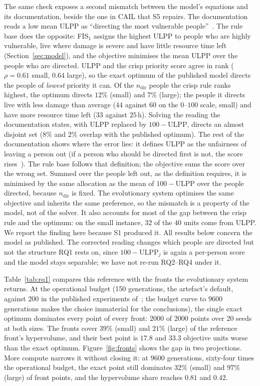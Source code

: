 \documentclass[systems,article,submit,moreauthors,pdftex]{Definitions/mdpi}
\begin{document}
The same check exposes a second mismatch between the model's equations and its
documentation, beside the one in CAIL that S5 repairs. The documentation reads a low mean ULPP
as ``directing the most vulnerable people''~\cite{rabiei2026resilient}. The rule base does the
opposite: FIS$_1$ assigns the highest ULPP to people who are highly vulnerable, live where
damage is severe and have little resource time left (Section~\ref{sec:model}), and the
objective minimises the mean ULPP over the people who are directed. ULPP and the crisp
priority score agree in rank ($\rho = 0.61$ small, $0.64$ large), so the exact optimum of the
published model directs the people of \emph{lowest} priority it can. Of the $n_{\mathrm{dir}}$
people the crisp rule ranks highest, the optimum directs $12\%$ (small) and $7\%$ (large); the
people it directs live with less damage than average ($44$ against $60$ on the $0$--$100$ scale,
small) and have more resource time left ($33$ against $25$\,h). Solving the reading the
documentation states, with ULPP replaced by $100 - \mathrm{ULPP}$, directs an almost disjoint
set ($8\%$ and $2\%$ overlap with the published optimum). The rest of the documentation shows
where the error lies: it defines ULPP as the unfairness of leaving a person out (if a person
who should be directed first is not, the score rises~\cite{rabiei2026resilient}). The rule base
follows that definition; the objective sums the score over the wrong set. Summed over the people
left out, as the definition requires, it is minimised by the same allocation as the mean of
$100 - \mathrm{ULPP}$ over the people directed, because $n_{\mathrm{dir}}$ is fixed. The evolutionary system optimises the
same objective and inherits the same preference, so the mismatch is a property of the model,
not of the solver. It also accounts for most of the gap between the crisp rule and the
optimum: on the small instance, $32$ of the $40$ units come from ULPP. We report the finding
here because S1 produced it. All results below concern the model as published. The corrected
reading changes which people are directed but not the structure RQ1 rests on, since
$100 - \mathrm{ULPP}_j$ is again a per-person score and the model stays separable; we have not
re-run RQ2--RQ4 under it.

Table~\ref{tab:rq1} compares this reference with the fronts the evolutionary system
returns. At the operational budget (150 generations, the artefact's default, against 200 in the
published experiments of~\cite{rabiei2026resilient}; the budget curve to 9600 generations makes the
choice immaterial for the conclusions), the
single exact optimum dominates every point of every front: $2000$ of $2000$ points over
20 seeds at both sizes. The fronts cover $39\%$ (small) and $21\%$ (large) of the reference
front's hypervolume, and their best point is $17.8$ and $33.3$ objective units worse than the
exact optimum. Figure~\ref{fig:fronts} shows the gap in two projections.
More compute narrows it without closing it: at $9600$ generations, sixty-four times the
operational budget, the exact point still dominates $32\%$ (small) and $97\%$ (large) of
front points, and the hypervolume share reaches $0.81$ and $0.42$.
\end{document}

